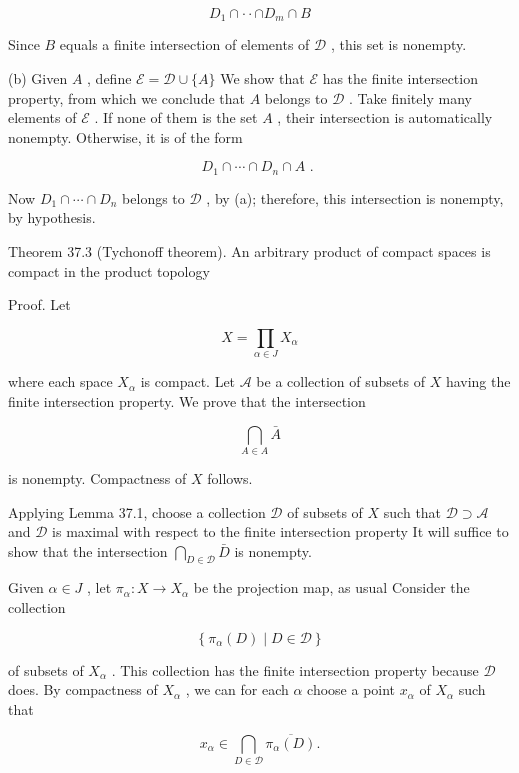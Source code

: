 \[
{D}_{1} \cap   \cdot   \cdot   \cap  {D}_{m} \cap  B
\]

Since \(B\) equals a finite intersection of elements of \(\mathcal{D}\) , this set is nonempty.

(b) Given \(A\) , define \(\mathcal{E} = \mathcal{D} \cup  \{ A\}\) We show that \(\mathcal{E}\) has the finite intersection property, from which we conclude that \(A\) belongs to \(\mathcal{D}\) . Take finitely many elements of \(\mathcal{E}\) . If none of them is the set \(A\) , their intersection is automatically nonempty. Otherwise, it is of the form

\[
{D}_{1} \cap  \cdots  \cap  {D}_{n} \cap  A\text{ . }
\]

Now \({D}_{1} \cap  \cdots  \cap  {D}_{n}\) belongs to \(\mathcal{D}\) , by (a); therefore, this intersection is nonempty, by hypothesis.

Theorem 37.3 (Tychonoff theorem). An arbitrary product of compact spaces is compact in the product topology

Proof. Let

\[
X = \mathop{\prod }\limits_{{\alpha  \in  J}}{X}_{\alpha }
\]

where each space \({X}_{\alpha }\) is compact. Let \(\mathcal{A}\) be a collection of subsets of \(X\) having the finite intersection property. We prove that the intersection

\[
\mathop{\bigcap }\limits_{{A \in  A}}\bar{A}
\]

is nonempty. Compactness of \(X\) follows.

Applying Lemma 37.1, choose a collection \(\mathcal{D}\) of subsets of \(X\) such that \(\mathcal{D} \supset  \mathcal{A}\) and \(\mathcal{D}\) is maximal with respect to the finite intersection property It will suffice to show that the intersection \(\mathop{\bigcap }\limits_{{D \in  \mathcal{D}}}\bar{D}\) is nonempty.

Given \(\alpha  \in  J\) , let \({\pi }_{\alpha } : X \rightarrow  {X}_{\alpha }\) be the projection map, as usual Consider the collection

\[
\left\{  {{\pi }_{\alpha }\left( D\right)  \mid  D \in  \mathcal{D}}\right\}
\]

of subsets of \({X}_{\alpha }\) . This collection has the finite intersection property because \(\mathcal{D}\) does. By compactness of \({X}_{\alpha }\) , we can for each \(\alpha\) choose a point \({x}_{\alpha }\) of \({X}_{\alpha }\) such that

\[
{x}_{\alpha } \in  \mathop{\bigcap }\limits_{{D \in  \mathcal{D}}}\overline{{\pi }_{\alpha }\left( D\right) }.
\]


